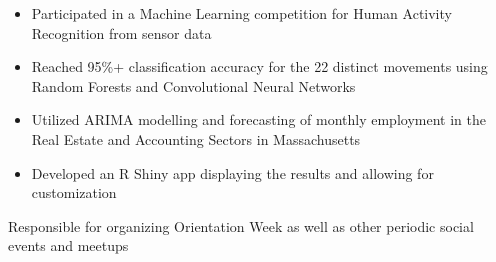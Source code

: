 
\begin{itemize}
    \item Participated in a Machine Learning competition for Human Activity Recognition from sensor data
    \item Reached 95\%+ classification accuracy for the 22 distinct movements using Random Forests and Convolutional Neural Networks
\end{itemize}

\divider

\begin{itemize}
    \item Utilized ARIMA modelling and forecasting of monthly employment in the Real Estate and Accounting Sectors in Massachusetts
    \item Developed an R Shiny app displaying the results and allowing for customization
\end{itemize}





\medskip


Responsible for organizing Orientation Week as well as other periodic social events and meetups

